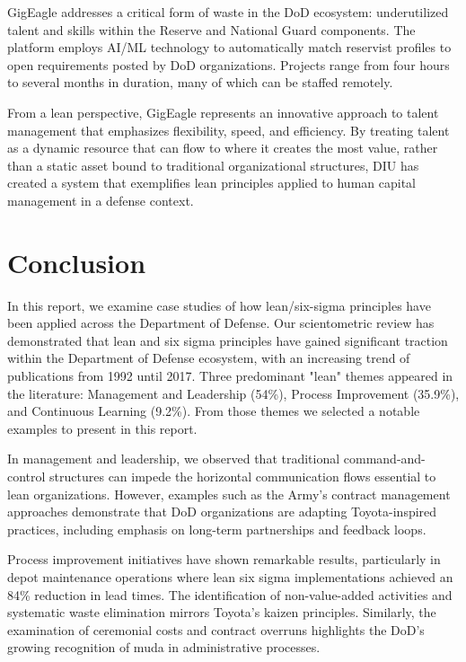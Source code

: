\documentclass{article}
\begin{document}
		GigEagle addresses a critical form of waste in the DoD ecosystem: underutilized talent and skills within the Reserve and National Guard components. 
		The platform employs AI/ML technology to automatically match reservist profiles to open requirements posted by DoD organizations. 
		Projects range from four hours to several months in duration, many of which can be staffed remotely. 

		From a lean perspective, GigEagle represents an innovative approach to talent management that emphasizes flexibility, speed, and efficiency.
		By treating talent as a dynamic resource that can flow to where it creates the most value, rather than a static asset bound to traditional organizational structures, DIU has created a system that exemplifies lean principles applied to human capital management in a defense context.


	\section{Conclusion}

		In this report, we examine case studies of how lean/six-sigma principles have been applied across the Department of Defense.
		Our scientometric review has demonstrated that lean and six sigma principles have gained significant traction within the Department of Defense ecosystem, with an increasing trend of publications from 1992 until 2017. 
		Three predominant "lean" themes appeared in the literature: Management and Leadership (54\%), Process Improvement (35.9\%), and Continuous Learning (9.2\%). 
		From those themes we selected a notable examples to present in this report.

		In management and leadership, we observed that traditional command-and-control structures can impede the horizontal communication flows essential to lean organizations.
		However, examples such as the Army's contract management approaches demonstrate that DoD organizations are adapting Toyota-inspired practices, including emphasis on long-term partnerships and feedback loops.

		Process improvement initiatives have shown remarkable results, particularly in depot maintenance operations where lean six sigma implementations achieved an 84\% reduction in lead times. 
		The identification of non-value-added activities and systematic waste elimination mirrors Toyota's kaizen principles. 
		Similarly, the examination of ceremonial costs and contract overruns highlights the DoD's growing recognition of muda in administrative processes.
\end{document}
